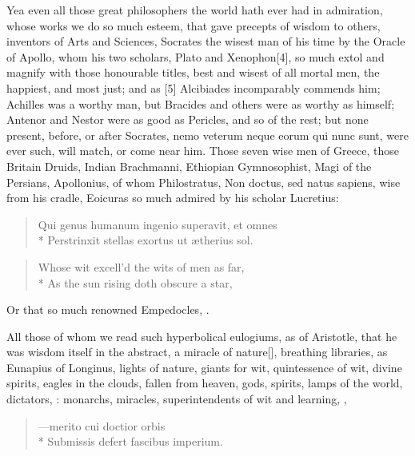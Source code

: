 {Yea even all those great philosophers the world hath ever had in
admiration, whose works we do so much esteem, that gave precepts of
wisdom to others, inventors of Arts and Sciences, Socrates the wisest
man of his time by the Oracle of Apollo, whom his two scholars,
Plato and Xenophon[4\baselineskip], so much extol and magnify with those
honourable titles, best and wisest of all mortal men, the happiest, and
most just; and as [5\baselineskip] Alcibiades incomparably commends him; Achilles
was a worthy man, but Bracides and others were as worthy as himself;
Antenor and Nestor were as good as Pericles, and so of the rest; but
none present, before, or after Socrates, nemo veterum neque eorum qui
nunc sunt, were ever such, will match, or come near him. Those seven
wise men of Greece, those Britain Druids, Indian Brachmanni, Ethiopian
Gymnosophist, Magi of the Persians, Apollonius, of whom Philostratus,
Non doctus, sed natus sapiens, wise from his cradle, Eoicuras so much
admired by his scholar Lucretius:

\begin{verse}
\textlatin{Qui genus humanum ingenio superavit, et omnes}\\*
\textlatin{Perstrinxit stellas exortus ut \ae{}therius sol.}
\end{verse}

\begin{verse}
Whose wit excell'd the wits of men as far,\\*
As the sun rising doth obscure a star,
\end{verse}

Or that so much renowned Empedocles, .

All those of whom we read such hyperbolical eulogiums, as of
Aristotle, that he was wisdom itself in the abstract, a miracle of
nature[\baselineskip], breathing libraries, as Eunapius of Longinus, lights of nature,
giants for wit, quintessence of wit, divine spirits, eagles in the
clouds, fallen from heaven, gods, spirits, lamps of the world,
dictators, : monarchs, miracles,
superintendents of wit and learning, ,

\begin{verse}
\textlatin{---merito cui doctior orbis}\\*
\textlatin{Submissis defert fascibus imperium.}
\end{verse}

}
